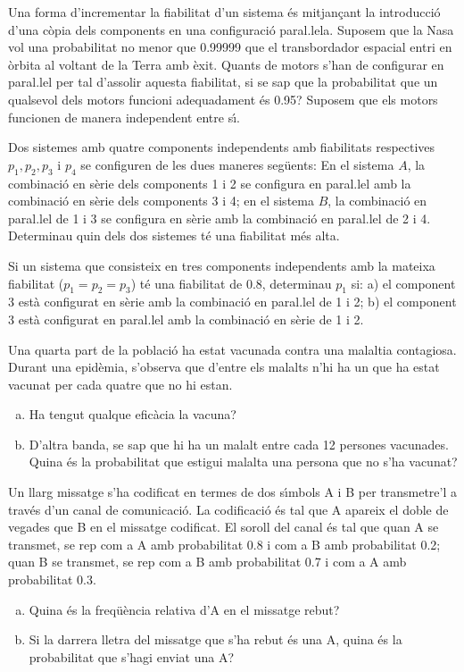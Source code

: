 \documentclass[12pt]{article}
\begin{document}
\probl  Una forma d'incrementar la fiabilitat d'un sistema \'{e}s
mitjan\c{c}ant la introducci\'{o} d'una c\`{o}pia dels components en una
configuraci\'{o} paral.lela. Suposem que la Nasa vol una probabilitat
no menor que 0.99999 que el transbordador espacial entri en \`{o}rbita
al voltant de la Terra amb \`{e}xit. Quants de motors s'han de
configurar en paral.lel per tal d'assolir aquesta fiabilitat, si
se sap que la probabilitat que un qualsevol dels motors funcioni
adequadament \'{e}s 0.95? Suposem que els motors funcionen de manera
independent entre s\'{\i}. 

\probl  Dos sistemes amb quatre components independents amb
fiabilitats respectives $p_1, p_2, p_3$ i $p_4$ se configuren de
les dues maneres seg\"{u}ents: En el sistema $A$, la combinaci\'{o} en
s\`{e}rie dels components 1 i 2 se configura en paral.lel amb la
combinaci\'{o} en s\`{e}rie dels components 3 i 4; en el sistema $B$, la
combinaci\'{o} en paral.lel de 1 i 3 se configura en s\`{e}rie amb la
combinaci\'{o} en paral.lel de 2 i 4. Determinau quin dels dos
sistemes t\'{e} una fiabilitat m\'{e}s alta. 

\probl  Si un sistema que consisteix en tres components
independents amb la mateixa fiabilitat ($p_1=p_2=p_3$) t\'{e} una
fiabilitat de 0.8, determinau $p_1$ si: a) el component 3 est\`{a}
configurat en s\`{e}rie amb la combinaci\'{o} en paral.lel de 1 i 2; b) el
component 3 est\`{a} configurat en paral.lel amb la combinaci\'{o} en
s\`{e}rie de 1 i 2. 

\probl  Una quarta part de la poblaci\'{o} ha estat vacunada contra
una malaltia contagiosa. Durant una epid\`{e}mia, s'observa que
d'entre els malalts n'hi ha un que ha estat vacunat per cada
quatre que no hi estan.
\begin{enumerate}[a)]
\item Ha tengut qualque efic\`{a}cia la vacuna?
\item D'altra banda, se sap que hi ha un malalt entre cada 12 persones
vacunades. Quina \'{e}s la probabilitat que estigui malalta una
persona que no s'ha vacunat?
\end{enumerate}

\probl  Un llarg missatge s'ha codificat en termes de dos s\'{\i}mbols
A i B per transmetre'l a trav\'{e}s d'un canal de comunicaci\'{o}. La
codificaci\'{o} \'{e}s tal que A apareix el doble de vegades que B en el
missatge codificat. El soroll del canal \'{e}s tal que quan A se
transmet, se rep com a A amb probabilitat 0.8 i com a B amb
probabilitat 0.2; quan B se transmet, se rep com a B amb
probabilitat 0.7 i com a A amb probabilitat 0.3.
\begin{enumerate}[a)]
\item Quina \'{e}s la freq\"{u}\`{e}ncia relativa d'A en el missatge rebut?
\item Si la darrera lletra del missatge que s'ha rebut \'{e}s una A, quina
\'{e}s la probabilitat que s'hagi enviat una A?
\end{enumerate}
\end{document}
